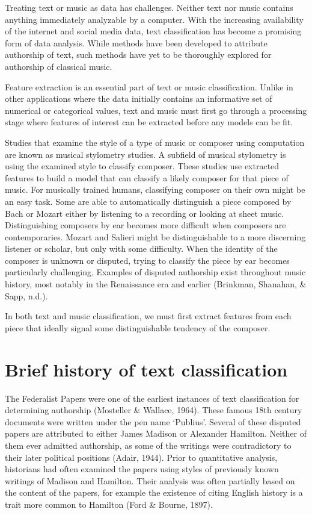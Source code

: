 \documentclass[12pt,twoside]{reedthesis}
\theoremstyle{definition}
\theoremstyle{definition}
\theoremstyle{definition}
\theoremstyle{remark}
\begin{document}
Treating text or music as data has challenges. Neither text nor music
contains anything immediately analyzable by a computer. With the
increasing availability of the internet and social media data, text
classification has become a promising form of data analysis. While
methods have been developed to attribute authorship of text, such
methods have yet to be thoroughly explored for authorship of classical
music.

Feature extraction is an essential part of text or music classification.
Unlike in other applications where the data initially contains an
informative set of numerical or categorical values, text and music must
first go through a processing stage where features of interest can be
extracted before any models can be fit.

Studies that examine the style of a type of music or composer using
computation are known as musical stylometry studies. A subfield of
musical stylometry is using the examined style to classify composer.
These studies use extracted features to build a model that can classify
a likely composer for that piece of music. For musically trained humans,
classifying composer on their own might be an easy task. Some are able
to automatically distinguish a piece composed by Bach or Mozart either
by listening to a recording or looking at sheet music. Distinguishing
composers by ear becomes more difficult when composers are
contemporaries. Mozart and Salieri might be distinguishable to a more
discerning listener or scholar, but only with some difficulty. When the
identity of the composer is unknown or disputed, trying to classify the
piece by ear becomes particularly challenging. Examples of disputed
authorship exist throughout music history, most notably in the
Renaissance era and earlier (Brinkman, Shanahan, \& Sapp, n.d.).

In both text and music classification, we must first extract features
from each piece that ideally signal some distinguishable tendency of the
composer.

\section{Brief history of text
classification}\label{brief-history-of-text-classification}

The Federalist Papers were one of the earliest instances of text
classification for determining authorship (Mosteller \& Wallace, 1964).
These famous 18th century documents were written under the pen name
`Publius'. Several of these disputed papers are attributed to either
James Madison or Alexander Hamilton. Neither of them ever admitted
authorship, as some of the writings were contradictory to their later
political positions (Adair, 1944). Prior to quantitative analysis,
historians had often examined the papers using styles of previously
known writings of Madison and Hamilton. Their analysis was often
partially based on the content of the papers, for example the existence
of citing English history is a trait more common to Hamilton (Ford \&
Bourne, 1897).
\end{document}
